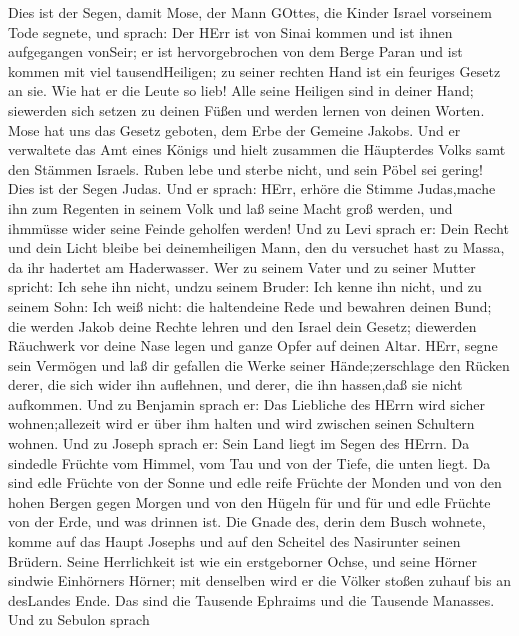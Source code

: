  Dies ist der Segen, damit Mose, der Mann GOttes, die Kinder
Israel vorseinem Tode segnete,  und sprach: Der HErr ist von
Sinai kommen und ist ihnen aufgegangen vonSeir; er ist hervorgebrochen
von dem Berge Paran und ist kommen mit viel tausendHeiligen; zu seiner
rechten Hand ist ein feuriges Gesetz an sie.  Wie hat er die
Leute so lieb! Alle seine Heiligen sind in deiner Hand; siewerden sich
setzen zu deinen Füßen und werden lernen von deinen Worten. 
Mose hat uns das Gesetz geboten, dem Erbe der Gemeine Jakobs.
 Und er verwaltete das Amt eines Königs und hielt zusammen
die Häupterdes Volks samt den Stämmen Israels.  Ruben lebe
und sterbe nicht, und sein Pöbel sei gering!  Dies ist der
Segen Judas. Und er sprach: HErr, erhöre die Stimme Judas,mache ihn zum
Regenten in seinem Volk und laß seine Macht groß werden, und ihmmüsse
wider seine Feinde geholfen werden!  Und zu Levi sprach er:
Dein Recht und dein Licht bleibe bei deinemheiligen Mann, den du
versuchet hast zu Massa, da ihr hadertet am Haderwasser. 
Wer zu seinem Vater und zu seiner Mutter spricht: Ich sehe ihn nicht,
undzu seinem Bruder: Ich kenne ihn nicht, und zu seinem Sohn: Ich weiß
nicht: die haltendeine Rede und bewahren deinen Bund;  die
werden Jakob deine Rechte lehren und den Israel dein Gesetz; diewerden
Räuchwerk vor deine Nase legen und ganze Opfer auf deinen Altar.
 HErr, segne sein Vermögen und laß dir gefallen die Werke
seiner Hände;zerschlage den Rücken derer, die sich wider ihn auflehnen,
und derer, die ihn hassen,daß sie nicht aufkommen.  Und zu
Benjamin sprach er: Das Liebliche des HErrn wird sicher wohnen;allezeit
wird er über ihm halten und wird zwischen seinen Schultern wohnen.
 Und zu Joseph sprach er: Sein Land liegt im Segen des
HErrn. Da sindedle Früchte vom Himmel, vom Tau und von der Tiefe, die
unten liegt.  Da sind edle Früchte von der Sonne und edle
reife Früchte der Monden  und von den hohen Bergen gegen
Morgen und von den Hügeln für und für  und edle Früchte von
der Erde, und was drinnen ist. Die Gnade des, derin dem Busch wohnete,
komme auf das Haupt Josephs und auf den Scheitel des Nasirunter seinen
Brüdern.  Seine Herrlichkeit ist wie ein erstgeborner
Ochse, und seine Hörner sindwie Einhörners Hörner; mit denselben wird er
die Völker stoßen zuhauf bis an desLandes Ende. Das sind die Tausende
Ephraims und die Tausende Manasses.  Und zu Sebulon sprach
